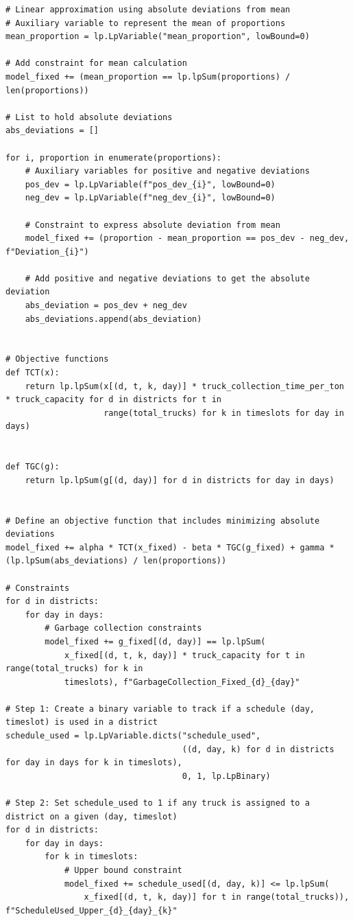 \documentclass{article}
\begin{document}
\begin{verbatim}
# Linear approximation using absolute deviations from mean
# Auxiliary variable to represent the mean of proportions
mean_proportion = lp.LpVariable("mean_proportion", lowBound=0)

# Add constraint for mean calculation
model_fixed += (mean_proportion == lp.lpSum(proportions) / len(proportions))

# List to hold absolute deviations
abs_deviations = []

for i, proportion in enumerate(proportions):
    # Auxiliary variables for positive and negative deviations
    pos_dev = lp.LpVariable(f"pos_dev_{i}", lowBound=0)
    neg_dev = lp.LpVariable(f"neg_dev_{i}", lowBound=0)

    # Constraint to express absolute deviation from mean
    model_fixed += (proportion - mean_proportion == pos_dev - neg_dev, f"Deviation_{i}")

    # Add positive and negative deviations to get the absolute deviation
    abs_deviation = pos_dev + neg_dev
    abs_deviations.append(abs_deviation)


# Objective functions
def TCT(x):
    return lp.lpSum(x[(d, t, k, day)] * truck_collection_time_per_ton * truck_capacity for d in districts for t in
                    range(total_trucks) for k in timeslots for day in days)


def TGC(g):
    return lp.lpSum(g[(d, day)] for d in districts for day in days)


# Define an objective function that includes minimizing absolute deviations
model_fixed += alpha * TCT(x_fixed) - beta * TGC(g_fixed) + gamma * (lp.lpSum(abs_deviations) / len(proportions))

# Constraints
for d in districts:
    for day in days:
        # Garbage collection constraints
        model_fixed += g_fixed[(d, day)] == lp.lpSum(
            x_fixed[(d, t, k, day)] * truck_capacity for t in range(total_trucks) for k in
            timeslots), f"GarbageCollection_Fixed_{d}_{day}"

# Step 1: Create a binary variable to track if a schedule (day, timeslot) is used in a district
schedule_used = lp.LpVariable.dicts("schedule_used",
                                    ((d, day, k) for d in districts for day in days for k in timeslots),
                                    0, 1, lp.LpBinary)

# Step 2: Set schedule_used to 1 if any truck is assigned to a district on a given (day, timeslot)
for d in districts:
    for day in days:
        for k in timeslots:
            # Upper bound constraint
            model_fixed += schedule_used[(d, day, k)] <= lp.lpSum(
                x_fixed[(d, t, k, day)] for t in range(total_trucks)), f"ScheduleUsed_Upper_{d}_{day}_{k}"


\end{verbatim}
\end{document}
